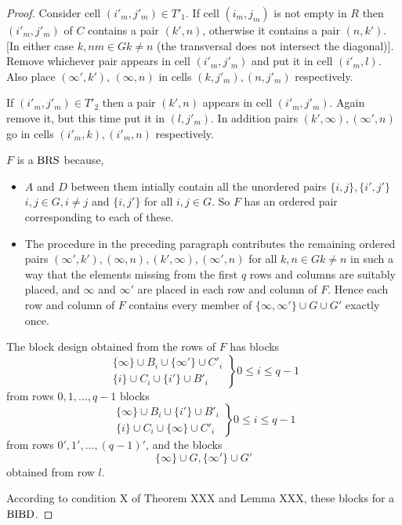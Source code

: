 \begin{proof}
Consider cell $(i'_m, j'_m) \in T'_1$. If cell $(i_m, j_m)$ is not empty in $R$ then $(i'_m, j'_m)$ of $C$ contains a pair $(k', n)$, otherwise it contains a pair $(n, k')$. [In either case $k, nm \in G k \neq n$ (the transversal does not intersect the diagonal)].
Remove whichever pair appears in cell $(i'_m, j'_m)$ and put it in cell $(i'_m, l)$.
Also place $(\infty', k')$, $(\infty, n)$ in cells $(k, j'_m), (n, j'_m)$ respectively.

If $(i'_m, j'_m) \in T'_2$ then a pair $(k', n)$ appears in cell $(i'_m, j'_m)$.
Again remove it, but this time put it in $(l, j'_m)$.
In addition pairs $(k', \infty), (\infty ', n)$ go in cells $(i'_m, k), (i'_m, n)$ respectively.

$F$ is a $\operatorname{BRS}$ because,
\begin{itemize}
  \item{$A$ and $D$ between them intially contain all the
    unordered pairs $\{i, j\}, \{i', j'\}$
    $i, j \in G, i\neq j$ and
    $\{i,j'\}$ for all $i,j \in G$. So $F$ has an
    ordered pair corresponding to each of these.}
  \item{The procedure in the preceding paragraph contributes
    the remaining ordered pairs
    $(\infty', k'),(\infty,n),(k',\infty),(\infty ',n)$ for all $k,n \in G k \neq n$
    in such a way that the
    elements missing from the first $q$ rows and columns are
    suitably placed, and $\infty$ and $\infty '$ are placed
    in each row and column of $F$.  Hence each row and
    column of $F$ contains every member of
    $\{\infty, \infty '\} \cup G \cup G'$
    exactly once.}
\end{itemize}

The block design obtained from the rows of $F$ has blocks
\begin{equation}
\left.
\begin{split}
\{\infty\} \cup B_i \cup \{\infty'\} \cup C'_i \\
\{i\} \cup C_i \cup \{i'\} \cup B'_i
\end{split}
\right \}
0 \leq i \leq q-1
\end{equation}
from rows $0, 1, \ldots, q - 1$ blocks
\begin{equation}
\left.
\begin{split}
\{\infty\} \cup B_i \cup \{i'\} \cup B'_i \\
\{i\} \cup C_i \cup \{\infty\} \cup C'_i
\end{split}
\right \}
0 \leq i \leq q-1
\end{equation}
from rows $0', 1', \ldots, (q - 1)'$, and the blocks
\begin{equation}
\{\infty\} \cup G, \{\infty '\} \cup G'
\end{equation}
obtained from row $l$.

According to condition X of Theorem XXX and Lemma XXX, these blocks for a $\operatorname{BIBD}$.
\end{proof}

